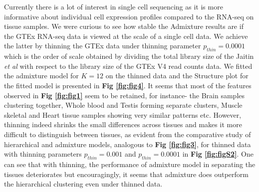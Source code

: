 Currently there is a lot of interest in single cell sequencing as it is more informative about individual cell expression profiles compared to the RNA-seq on tissue samples. We were curious to see how stable the Admixture results are if the GTEx RNA-seq data is viewed at the scale of a single cell data. We achieve the latter by thinning the GTEx data under thinning parameter $p_{thin}=0.0001$ which is the order of scale obtained by dividing the total library size of the Jaitin \textit{et al} \cite{Jaitin2014} with respect to the library size of the GTEx V4 read counts data. We fitted the admixture model for $K=12$ on the thinned data and the Structure plot for the fitted model is presented in \textbf{Fig \ref{fig:fig4}}. It seems that most of the features observed in \textbf{Fig \ref{fig:fig1}} seem to be retained, for instance- the Brain samples clustering together, Whole blood and Testis forming separate clusters, Muscle skeletal and Heart tissue samples showing very similar patterns etc. However, thinning indeed shrinks the small differences across tissues and makes it more difficult to distinguish between tissues, as evident from the comparative study of hierarchical and admixture models, analogous to \textbf{Fig \ref{fig:fig3}}, for thinned data with thinning parameters $p_{thin}=0.001$ and $p_{thin}=0.0001$ in  \textbf{Fig \ref{fig:figS2}}. One can see that with thinning, the performance of admixture model in separating the tissues deteriorates but encouragingly, it seems that admixture does outperform the hierarchical clustering even under thinned data. \\[3pt]

